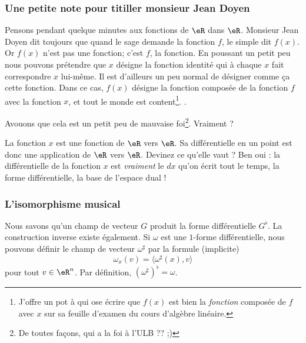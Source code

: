 \subsubsection{Une petite note pour titiller monsieur Jean Doyen}

Pensons pendant quelque minutes aux fonctions de $\eR$ dans $\eR$. Monsieur Jean Doyen dit toujours que quand le sage demande la fonction $f$, le simple dit \og $f(x)$\fg. Or $f(x)$ n'est pas une fonction; c'est $f$, la fonction. En poussant un petit peu nous pouvons prétendre que $x$ désigne la fonction identité qui à chaque $x$ fait correspondre $x$ lui-même. Il est d'ailleurs un peu normal de désigner comme ça cette fonction. Dans ce cas, $f(x)$ désigne la fonction composée de la fonction $f$ avec la fonction $x$, et tout le monde est content\footnote{J'offre un pot à qui ose écrire que $f(x)$ est bien la \emph{fonction} composée de $f$ avec $x$ sur sa feuille d'examen du cours d'algèbre linéaire.}. .

Avouons que cela est un petit peu de mauvaise foi\footnote{De toutes façons, qui a la foi à l'ULB ?? ;)}. Vraiment ?

La fonction $x$ est une fonction de $\eR$ vers $\eR$. Sa différentielle en un point est donc une application de $\eR$ vers $\eR$. Devinez ce qu'elle vaut ? Ben oui : la différentielle de la fonction $x$ est \emph{vraiment} le $dx$ qu'on écrit tout le temps, la forme différentielle, la base de l'espace dual !

\subsubsection{L'isomorphisme musical}

Nous savons qu'un champ de vecteur $G$ produit la forme différentielle $G^{\flat}$. La construction inverse existe également. Si $\omega$ est une $1$-forme différentielle, nous pouvons définir le champ de vecteur $\omega^{\sharp}$ par la formule (implicite)
\begin{equation}
	\omega_x(v)=\langle \omega^{\sharp}(x), v\rangle 
\end{equation}
pour tout $v\in\eR^n$. Par définition, $(\omega^{\sharp})^{\flat}=\omega$. 


